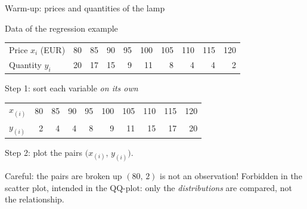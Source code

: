\documentclass[aspectratio=169,11pt]{beamer}
\begin{document}
\begin{frame}{Warm-up: prices and quantities of the lamp}
  \small
  \begin{block}{Data of the regression example}
    \begin{center}
      \begin{tabular}{l*{9}{r}}
        \toprule
        Price $x_i$ (EUR)  & 80 & 85 & 90 & 95 & 100 & 105 & 110 & 115 & 120 \\
        Quantity $y_i$      & 20 & 17 & 15 & 9  & 11  & 8   & 4   & 4   & 2   \\
        \bottomrule
      \end{tabular}
    \end{center}
  \end{block}

  \begin{block}{Step 1: sort each variable \emph{on its own}}
    \begin{center}
      \begin{tabular}{l*{9}{r}}
        \toprule
        $x_{(i)}$ & 80 & 85 & 90 & 95 & 100 & 105 & 110 & 115 & 120 \\
        $y_{(i)}$ & 2  & 4  & 4  & 8  & 9   & 11  & 15  & 17  & 20  \\
        \bottomrule
      \end{tabular}
    \end{center}
    Step 2: plot the pairs $\bigl(x_{(i)},\, y_{(i)}\bigr)$.
  \end{block}

  \begin{alertblock}{Careful: the pairs are broken up}
    $(80,\,2)$ is not an observation! Forbidden in the scatter plot, intended in
    the QQ-plot: only the \emph{distributions} are compared, not the
    relationship.
  \end{alertblock}
\end{frame}
\end{document}
